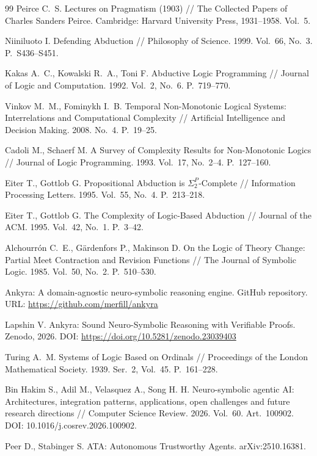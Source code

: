 \documentclass[12pt,a4paper]{article}
\begin{document}
\begin{thebibliography}{99}
	 Peirce C.~S. Lectures on Pragmatism (1903) // The Collected Papers of Charles Sanders Peirce. Cambridge: Harvard University Press, 1931--1958. Vol.~5.

	 Niiniluoto I. Defending Abduction // Philosophy of Science. 1999. Vol.~66, No.~3. P.~S436--S451.

	 Kakas A.~C., Kowalski R.~A., Toni F. Abductive Logic Programming // Journal of Logic and Computation. 1992. Vol.~2, No.~6. P.~719--770.

	 Vinkov M.~M., Fominykh I.~B. Temporal Non-Monotonic Logical Systems: Interrelations and Computational Complexity // Artificial Intelligence and Decision Making. 2008. No.~4. P.~19--25.

	 Cadoli M., Schaerf M. A Survey of Complexity Results for Non-Monotonic Logics // Journal of Logic Programming. 1993. Vol.~17, No.~2--4. P.~127--160.

	 Eiter T., Gottlob G. Propositional Abduction is $\Sigma_2^P$-Complete // Information Processing Letters. 1995. Vol.~55, No.~4. P.~213--218.

	 Eiter T., Gottlob G. The Complexity of Logic-Based Abduction // Journal of the ACM. 1995. Vol.~42, No.~1. P.~3--42.

	 Alchourr\'on C.~E., G\"ardenfors P., Makinson D. On the Logic of Theory Change: Partial Meet Contraction and Revision Functions // The Journal of Symbolic Logic. 1985. Vol.~50, No.~2. P.~510--530.

	 Ankyra: A domain-agnostic neuro-symbolic reasoning engine. GitHub repository. URL: \url{https://github.com/merfill/ankyra}

	 Lapshin V. Ankyra: Sound Neuro-Symbolic Reasoning with Verifiable Proofs. Zenodo, 2026. DOI: \url{https://doi.org/10.5281/zenodo.23039403} 

	 Turing A.~M. Systems of Logic Based on Ordinals // Proceedings of the London Mathematical Society. 1939. Ser.~2, Vol.~45. P.~161--228.

	 Bin Hakim S., Adil M., Velasquez A., Song H. H. Neuro-symbolic agentic AI: Architectures, integration patterns, applications, open challenges and future research directions // Computer Science Review. 2026. Vol.~60. Art.~100902. DOI: 10.1016/j.cosrev.2026.100902.

	 Peer D., Stabinger S. ATA: Autonomous Trustworthy Agents. arXiv:2510.16381.


\end{thebibliography}
\end{document}
